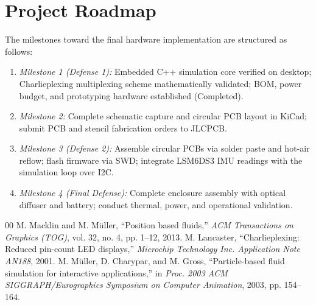 \documentclass[conference]{IEEEtran}
\begin{document}
\section{Project Roadmap}
The milestones toward the final hardware implementation are structured as follows:
\begin{enumerate}
    \item \emph{Milestone 1 (Defense 1):} Embedded C++ simulation core verified on desktop; Charlieplexing multiplexing scheme mathematically validated; BOM, power budget, and prototyping hardware established (Completed).
    \item \emph{Milestone 2:} Complete schematic capture and circular PCB layout in KiCad; submit PCB and stencil fabrication orders to JLCPCB.
    \item \emph{Milestone 3 (Defense 2):} Assemble circular PCBs via solder paste and hot-air reflow; flash firmware via SWD; integrate LSM6DS3 IMU readings with the simulation loop over I2C.
    \item \emph{Milestone 4 (Final Defense):} Complete enclosure assembly with optical diffuser and battery; conduct thermal, power, and operational validation.
\end{enumerate}

\begin{thebibliography}{00}
 M. Macklin and M. M{\"u}ller, ``Position based fluids,'' \textit{ACM Transactions on Graphics (TOG)}, vol. 32, no. 4, pp. 1--12, 2013.
 M. Lancaster, ``Charlieplexing: Reduced pin-count LED displays,'' \textit{Microchip Technology Inc. Application Note AN188}, 2001.
 M. M{\"u}ller, D. Charypar, and M. Gross, ``Particle-based fluid simulation for interactive applications,'' in \textit{Proc. 2003 ACM SIGGRAPH/Eurographics Symposium on Computer Animation}, 2003, pp. 154--164.
\end{thebibliography}
\end{document}
